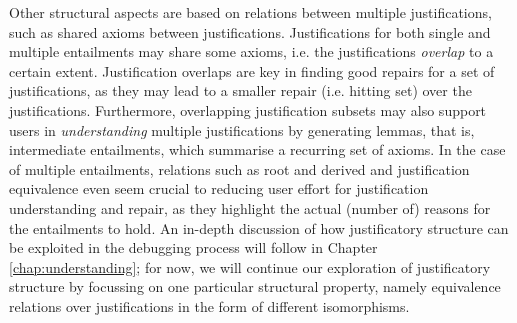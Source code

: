 Other structural aspects are based on relations between multiple justifications, such as shared axioms between justifications. Justifications for both single and multiple entailments may share some axioms, i.e. the justifications \emph{overlap} to a certain extent. Justification overlaps are key in finding good repairs for a set of justifications, as they may lead to a smaller repair (i.e. hitting set) over the justifications.  Furthermore, overlapping justification subsets may also support users in \emph{understanding} multiple justifications by generating lemmas, that is, intermediate entailments, which summarise a recurring set of axioms. In the case of multiple entailments, relations such as root and derived and justification equivalence even seem crucial to reducing user effort for justification understanding and repair, as they highlight the actual (number of) reasons for the entailments to hold. An in-depth discussion of how justificatory structure can be exploited in the debugging process will follow in Chapter \ref{chap:understanding}; for now, we will continue our exploration of justificatory structure by focussing on one particular structural property, namely equivalence relations over justifications in the form of different isomorphisms.
